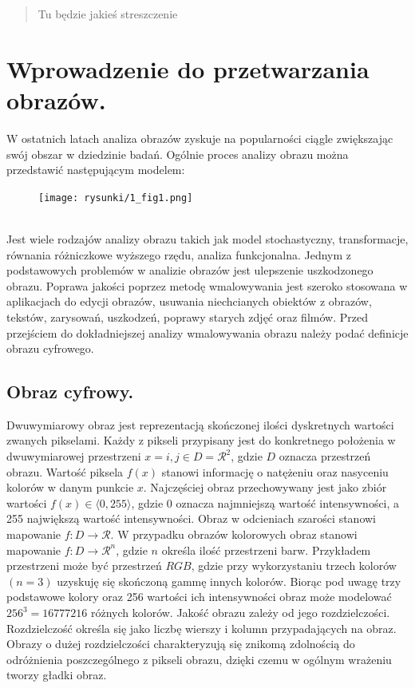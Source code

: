 \documentclass[12pt, twoside, openany]{report}
\theoremstyle{definition}
\begin{document}
\begin{abstract}
Tu będzie jakieś streszczenie
\end{abstract}


\chapter{Wprowadzenie do przetwarzania obrazów.}
W ostatnich latach analiza obrazów zyskuje na popularności ciągle zwiększając swój obszar w dziedzinie badań. Ogólnie proces analizy obrazu można przedstawić następującym modelem: \\
\begin{figure}[!h]
	\centering
	\texttt{[image: rysunki/1\_fig1.png]}
\end{figure}
\\
Jest wiele rodzajów analizy obrazu takich jak model stochastyczny, transformacje, równania różniczkowe wyższego rzędu, analiza funkcjonalna. Jednym z podstawowych problemów w analizie obrazów jest ulepszenie uszkodzonego obrazu. Poprawa jakości poprzez metodę wmalowywania jest szeroko stosowana w aplikacjach do edycji obrazów, usuwania niechcianych obiektów z obrazów, tekstów, zarysowań, uszkodzeń, poprawy starych zdjęć oraz filmów. Przed przejściem do dokładniejszej analizy wmalowywania obrazu należy podać definicje obrazu cyfrowego.
\section{Obraz cyfrowy.}
Dwuwymiarowy obraz jest reprezentacją skończonej ilości dyskretnych wartości zwanych pikselami. Każdy z pikseli przypisany jest do konkretnego położenia w dwuwymiarowej przestrzeni $x = {i,j} \in D=\mathcal{R}^2$, gdzie $D$ oznacza przestrzeń obrazu. Wartość piksela $f(x)$ stanowi informację o natężeniu oraz nasyceniu kolorów w danym punkcie $x$. Najczęściej obraz przechowywany jest jako zbiór wartości $f(x) \in \langle 0,255 \rangle$, gdzie 0 oznacza najmniejszą wartość intensywności, a 255 największą wartość intensywności. Obraz w odcieniach szarości stanowi mapowanie $f: D \rightarrow \mathcal{R}$. W przypadku obrazów kolorowych obraz stanowi mapowanie $f: D \rightarrow \mathcal{R}^n$, gdzie $n$ określa ilość przestrzeni barw. Przykładem przestrzeni może być przestrzeń $RGB$, gdzie przy wykorzystaniu trzech kolorów $(n=3)$ uzyskuję się skończoną gammę innych kolorów. Biorąc pod uwagę trzy podstawowe kolory oraz 256 wartości ich intensywności obraz może modelować $256^3=16777216$ różnych kolorów. Jakość obrazu zależy od jego rozdzielczości. Rozdzielczość określa się jako liczbę wierszy i kolumn przypadających na obraz. Obrazy o dużej rozdzielczości charakteryzują się znikomą zdolnością do odróżnienia poszczególnego z pikseli obrazu, dzięki czemu w ogólnym wrażeniu tworzy gładki obraz.
\end{document}
